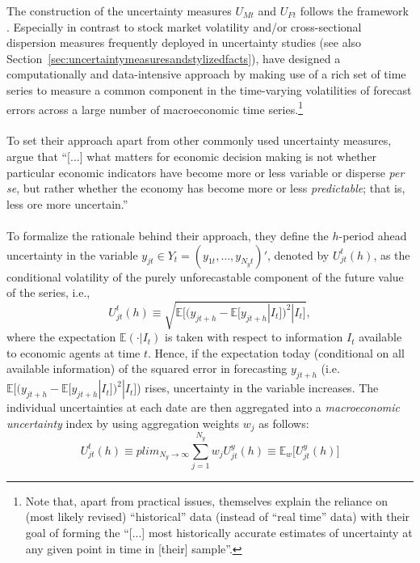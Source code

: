 \documentclass[a4paper,11pt,listof=nochaptergap,oneside,pointednumbers,bibtotoc,bigheadings,liststotoc,hidelinks]{scrbook}
\theoremstyle{mysatz}
\theoremstyle{mydefinition}
\theoremstyle{mytheorem}
\theoremstyle{mybemerkung}
\begin{document}
The construction of the uncertainty measures $U_{Mt}$ and $U_{Ft}$ follows the framework \citet{juradoetal:15}. Especially in contrast to stock market volatility and/or cross-sectional dispersion measures frequently deployed in uncertainty studies (see also Section~\ref{sec:uncertaintymeasuresandstylizedfacts}), \citet{juradoetal:15} have designed a computationally and data-intensive approach by making use of a rich set of time series to measure a common component in the time-varying volatilities of forecast errors across a large number of macroeconomic time series.\footnote{Note that, apart from practical issues, \citet[p. 1191]{juradoetal:15} themselves explain the reliance on (most likely revised) ``historical'' data (instead of ``real time'' data) with their goal of forming the ``[...] most historically accurate estimates of uncertainty at any given point in time in [their] sample''.}\\
\\
To set their approach apart from other commonly used uncertainty measures, \citet[p. 1178]{juradoetal:15} argue that ``[...] what matters for economic decision making is not whether particular economic indicators have become more or less variable or disperse \textit{per se}, but rather whether the economy has become more or less \textit{predictable}; that is, less ore more uncertain.''\\
\\
To formalize the rationale behind their approach, they define the $h$-period ahead uncertainty in the variable $y_{jt} \in Y_t = (y_{1t}, \ldots, y_{N_{y}t})'$, denoted by $U^t_{jt}(h)$, as the conditional volatility of the purely unforecastable component of the future value of the series, i.e.,
\begin{equation} \label{eq:juradoetal_1}
U^t_{jt}(h) \equiv \sqrt{\mathbb{E}\Big[(y_{jt+h} - \mathbb{E}[y_{jt+h}|I_t])^2|I_t\Big]},
\end{equation}
where the expectation $\mathbb{E}(\cdot|I_t)$ is taken with respect to information $I_t$ available to economic agents at time $t$. Hence, if the expectation today (conditional on all available information) of the squared error in forecasting $y_{jt+h}$ (i.e. $\mathbb{E}\Big[(y_{jt+h} - \mathbb{E}[y_{jt+h}|I_t])^2|I_t\Big]$) rises, uncertainty in the variable increases. The individual uncertainties at each date are then aggregated into a \textit{macroeconomic uncertainty} index by using aggregation weights $w_j$ as follows:
\begin{equation} \label{eq:juradoetal_2}
U^t_{jt}(h) \equiv plim_{N_{y}\to\infty} \sum_{j=1}^{N_y} w_j U_{jt}^y(h) \equiv \mathbb{E}_w \Big[U_{jt}^y(h)\Big]
\end{equation}
\end{document}

